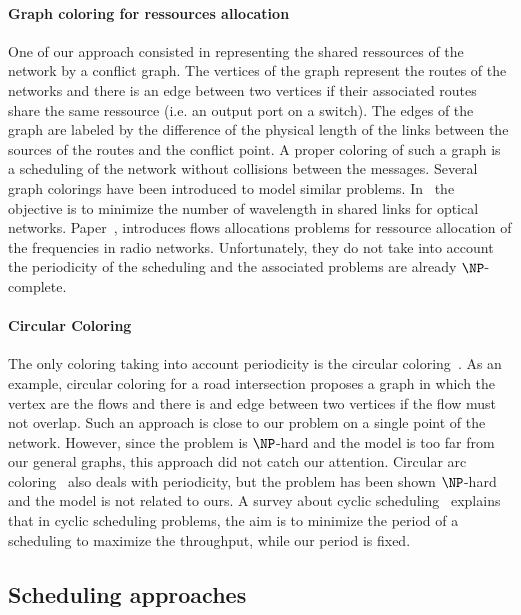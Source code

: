 \paragraph{Graph coloring for ressources allocation}
One of our approach consisted in representing the shared ressources of the network by a conflict graph. The vertices of the graph represent the routes of the networks and there is an edge between two vertices if their associated routes share the same ressource (i.e. an output port on a switch). The edges of the graph are labeled by the difference of the physical length of the links between the sources of the routes and the conflict point. A proper coloring of such a graph is a scheduling of the network without collisions between the messages. Several graph colorings have been introduced to model similar problems. In~\cite{erlebach2001complexity} the objective is to minimize the number of wavelength in shared links for optical networks. Paper~\cite{borndorfer1998frequency}, introduces flows allocations problems for ressource allocation of the frequencies in radio networks. Unfortunately, they do not take into account the periodicity of the scheduling and the associated problems are already $\NP$-complete. 

\paragraph{Circular Coloring}
The only coloring taking into account periodicity is the circular coloring~\cite{ZHU2001371,zhou2013multiple}. As an example, circular coloring for a road intersection proposes a graph in which the vertex are the flows and there is and edge between two vertices if the flow must not overlap. Such an approach is close to our problem on a single point of the network. However, since the problem is $\NP$-hard and the model is too far from our general graphs, this approach did not catch our attention.
Circular arc coloring~\cite{10.2307/2100446} also deals with periodicity, but the problem has been shown $\NP$-hard~\cite{10.1007/BFb0053971} and the model is not related to ours. A survey about cyclic scheduling~\cite{levner2010complexity} explains that in cyclic scheduling problems, the aim is to minimize the period of a scheduling to maximize the throughput, while our period is fixed. 

\subsection{Scheduling approaches}


